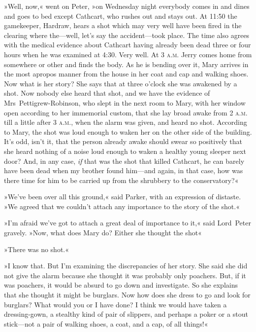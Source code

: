 »Well, now,« went on Peter, »on Wednesday night everybody comes in and dines and goes to bed except Cathcart, who rushes out and stays out. At 11:50 the gamekeeper, Hardraw, hears a shot which may very well have been fired in the clearing where the—well, let's say the accident—took place. The time also agrees with the medical evidence about Cathcart having already been dead three or four hours when he was examined at 4:30. Very well. At 3 \textsc{a.m.} Jerry comes home from somewhere or other and finds the body. As he is bending over it, Mary arrives in the most apropos manner from the house in her coat and cap and walking shoes. Now what is her story? She says that at three o'clock she was awakened by a shot. Now nobody else heard that shot, and we have the evidence of Mrs~Pettigrew-Robinson, who slept in the next room to Mary, with her window open according to her immemorial custom, that she lay broad awake from 2 \textsc{a.m.} till a little after 3 \textsc{a.m.}, when the alarm was given, and heard no shot. According to Mary, the shot was loud enough to waken her on the other side of the building. It's odd, isn't it, that the person already awake should swear so positively that she heard nothing of a noise loud enough to waken a healthy young sleeper next door? And, in any case, \textit{if} that was the shot that killed Cathcart, he can barely have been dead when my brother found him—and again, in that case, how was there time for him to be carried up from the shrubbery to the conservatory?«

»We've been over all this ground,« said Parker, with an expression of distaste. »We agreed that we couldn't attach any importance to the story of the shot.«

»I'm afraid we've got to attach a great deal of importance to it,« said Lord~Peter gravely. »Now, what does Mary do? Either she thought the shot\longdash«

»There was no shot.«

»I know that. But I'm examining the discrepancies of her story. She said she did not give the alarm because she thought it was probably only poachers. But, if it was poachers, it would be absurd to go down and investigate. So she explains that she thought it might be burglars.  Now how does she dress to go and look for burglars? What would you or I have done? I think we would have taken a dressing-gown, a stealthy kind of pair of slippers, and perhaps a poker or a stout stick—not a pair of walking shoes, a coat, and a cap, of all things!«


